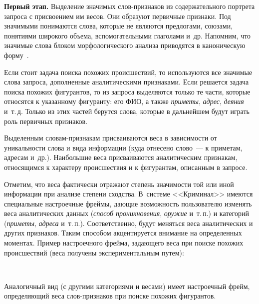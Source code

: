 \begin{multicols}{2}
    \textbf{Первый этап.} Выделение значимых слов-приз\-на\-ков из 
содержательного портрета запроса с присвоением им весов. Они образуют 
первичные признаки. Под значимыми понимаются слова, которые не являются 
предлогами, союзами, понятиями широкого объема, вспомогательными 
глаголами и~др. Напомним, что значимые слова блоком морфологического 
анализа приводятся в каноническую форму~\cite{4sha}.
    
    Если стоит задача поиска похожих про\-ис\-шест\-вий, то используются все 
значимые слова запроса, дополненные аналитическими признаками. Если 
решается задача поиска похожих фигурантов, то из запроса выделяются только 
те части, которые относятся к указанному фигуранту: его ФИО, а также 
\textit{приметы}, \textit{адрес}, \textit{деяния} и~т.\,д. Только из этих частей 
берутся слова, которые в дальнейшем будут играть роль первичных признаков.
    
    Выделенным словам-признакам присваиваются веса в зависимости от 
уникальности слова и вида информации (куда отнесено слово~--- к приметам, 
адресам и~др.). Наибольшие веса присваиваются аналитическим признакам, 
относящимся к характеру происшествия и к фигурантам, описанным в запросе.
    
    Отметим, что веса фактически отражают степень значимости той или иной 
информации при анализе степени сходства. В~системе <<Криминал>> имеются 
специальные настроечные фреймы, да\-ющие возможность пользователю 
изменять веса аналитических данных (\textit{способ проникновения}, 
\textit{оружие} и~т.\,п.) и категорий (\textit{приметы}, \textit{адреса} и~т.\,п.). 
Соответственно, будут меняться веса аналитических и других признаков. Таким 
способом акцентируется внимание на определенных моментах. Пример настроечного фрейма, 
задающего веса при поиске похожих происшествий
(веса получены экспериментальным путем):
\begin{center} %
\vspace*{6pt}
\mbox{%
 \epsfxsize=78mm
}
\end{center}
\begin{center}
\vspace*{-9pt}
\end{center}



 

        
    Аналогичный вид (с другими категориями и весами) имеет настроечный 
фрейм, определяющий веса слов-признаков при поиске похожих фигурантов.
    

\end{multicols}
